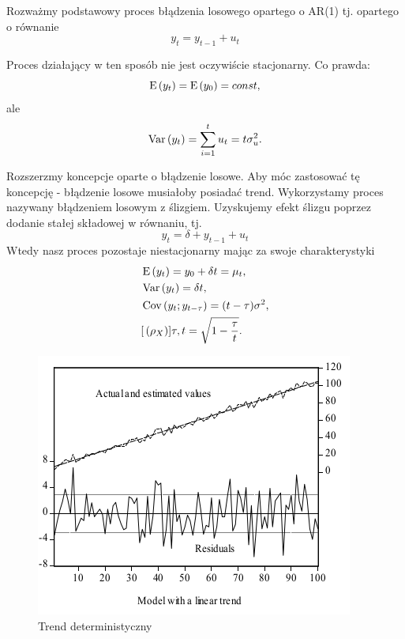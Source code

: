 \documentclass[10pt,a4paper]{book}
\begin{document}
Rozważmy podstawowy proces błądzenia losowego opartego o AR(1) tj. opartego o równanie
$$
y_t = y_{t-1} + u_t
$$

Proces działający w ten sposób nie jest oczywiście stacjonarny. Co prawda:
$$
\operatorname{E} \left({y_t} \right) = \operatorname{E} \left({y_0} \right) = const,
$$
ale
$$
\Variance{y_t} = \sum_{i=1}^{t} u_t = t \sigma^2_u.
$$

Rozszerzmy koncepcje oparte o błądzenie losowe. Aby móc zastosować tę koncepcję - błądzenie losowe musiałoby posiadać trend. Wykorzystamy proces nazywany błądzeniem losowym z ślizgiem. Uzyskujemy efekt ślizgu poprzez dodanie stałej składowej w równaniu, tj. 
$$
y_t = \delta + y_{t-1} + u_t
$$
Wtedy nasz proces pozostaje niestacjonarny mając za swoje charakterystyki
\begin{align*}
& \operatorname{E} \left({y_t} \right)= y_0 + \delta t = \mu_t, \\
& \operatorname{Var} \left( {y_t} \right) = \delta t , \\
& \operatorname{Cov} \left( {y_t};{y_{t-\tau}} \right)= (t-\tau) \sigma^2, \\
& {{[}\left( {\rho_X} \right)}]{\tau,t} = \sqrt{1 - \frac{\tau}{t}}.
\end{align*}

\begin{figure}
\centering
\includegraphics[scale=1]{images/deterministic_trend_residuas.png}
\caption{Trend deterministyczny}
\label{figure-deterministic-trend}
\end{figure}
\end{document}
